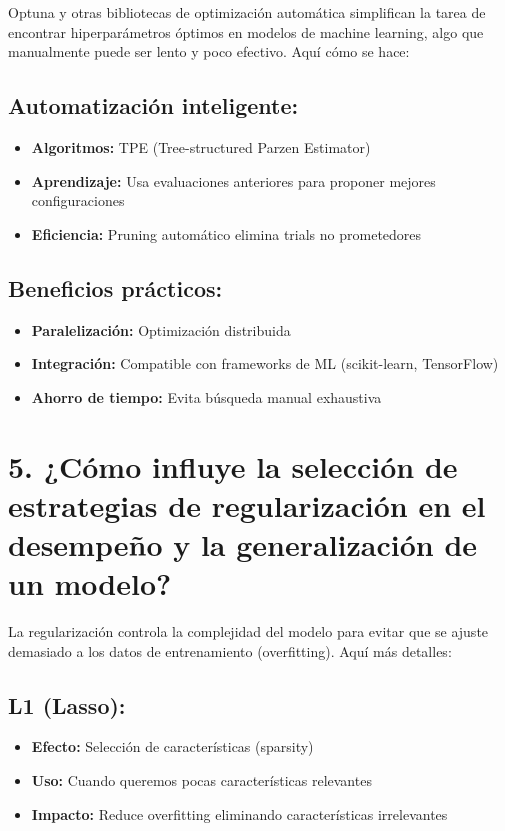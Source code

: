 \documentclass[12pt,a4paper]{article}
\begin{document}
Optuna y otras bibliotecas de optimización automática simplifican la tarea de encontrar hiperparámetros óptimos en modelos de machine learning, algo que manualmente puede ser lento y poco efectivo. Aquí cómo se hace:

\subsection*{Automatización inteligente:}
\begin{itemize}[leftmargin=1.5cm]
    \item \textbf{Algoritmos:} TPE (Tree-structured Parzen Estimator)
    \item \textbf{Aprendizaje:} Usa evaluaciones anteriores para proponer mejores configuraciones
    \item \textbf{Eficiencia:} Pruning automático elimina trials no prometedores
\end{itemize}

\subsection*{Beneficios prácticos:}
\begin{itemize}[leftmargin=1.5cm]
    \item \textbf{Paralelización:} Optimización distribuida
    \item \textbf{Integración:} Compatible con frameworks de ML (scikit-learn, TensorFlow)
    \item \textbf{Ahorro de tiempo:} Evita búsqueda manual exhaustiva
\end{itemize}

\section*{5. ¿Cómo influye la selección de estrategias de regularización en el desempeño y la generalización de un modelo?}

La regularización controla la complejidad del modelo para evitar que se ajuste demasiado a los datos de entrenamiento (overfitting). Aquí más detalles:

\subsection*{L1 (Lasso):}
\begin{itemize}[leftmargin=1.5cm]
    \item \textbf{Efecto:} Selección de características (sparsity)
    \item \textbf{Uso:} Cuando queremos pocas características relevantes
    \item \textbf{Impacto:} Reduce overfitting eliminando características irrelevantes
\end{itemize}
\end{document}
